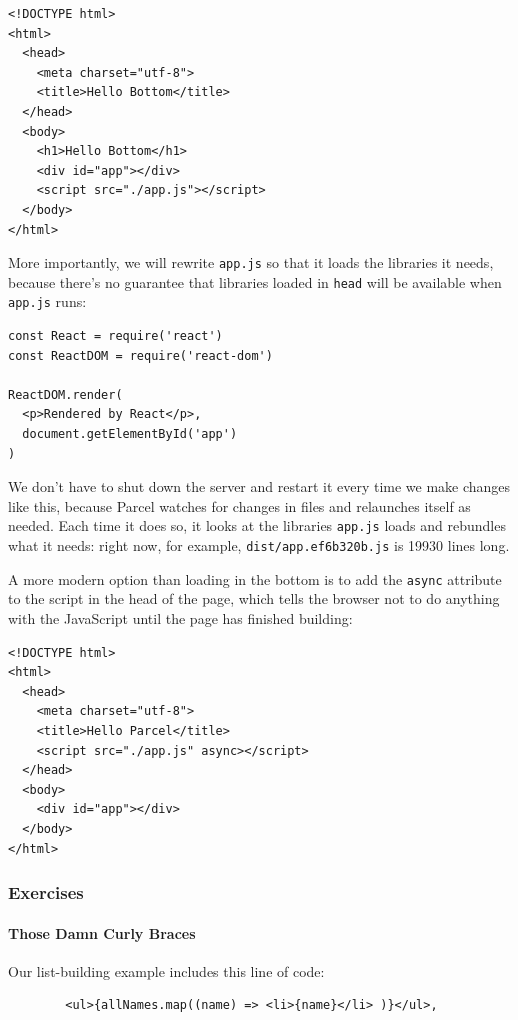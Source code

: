 \begin{verbatim}
<!DOCTYPE html>
<html>
  <head>
    <meta charset="utf-8">
    <title>Hello Bottom</title>
  </head>
  <body>
    <h1>Hello Bottom</h1>
    <div id="app"></div>
    <script src="./app.js"></script>
  </body>
</html>
\end{verbatim}

More importantly, we will rewrite \texttt{app.js} so that it loads the
libraries it needs, because there's no guarantee that libraries loaded
in \texttt{head} will be available when \texttt{app.js} runs:

\begin{verbatim}
const React = require('react')
const ReactDOM = require('react-dom')

ReactDOM.render(
  <p>Rendered by React</p>,
  document.getElementById('app')
)
\end{verbatim}

We don't have to shut down the server and restart it every time we make
changes like this, because Parcel watches for changes in files and
relaunches itself as needed. Each time it does so, it looks at the
libraries \texttt{app.js} loads and rebundles what it needs: right now,
for example, \texttt{dist/app.ef6b320b.js} is 19930 lines long.

A more modern option than loading in the bottom is to add the
\texttt{async} attribute to the script in the head of the page, which
tells the browser not to do anything with the JavaScript until the page
has finished building:

\begin{verbatim}
<!DOCTYPE html>
<html>
  <head>
    <meta charset="utf-8">
    <title>Hello Parcel</title>
    <script src="./app.js" async></script>
  </head>
  <body>
    <div id="app"></div>
  </body>
</html>
\end{verbatim}

\subsubsection{Exercises}\label{s:dynamic-exercises}

\paragraph{Those Damn Curly Braces}\label{those-damn-curly-braces}

Our list-building example includes this line of code:

\begin{verbatim}
        <ul>{allNames.map((name) => <li>{name}</li> )}</ul>,
\end{verbatim}

